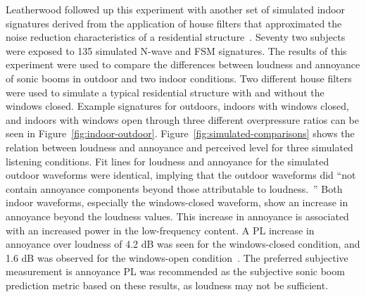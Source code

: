 \documentclass[]{aiaa-tc}%
\begin{document}
Leatherwood followed up this experiment with another set of simulated indoor signatures derived from the application of house filters that approximated the noise reduction characteristics of a residential structure~\cite{leatherwood1993loudness}. Seventy two subjects were exposed to 135 simulated N-wave and FSM signatures. The results of this experiment were used to compare the differences between loudness and annoyance of sonic booms in outdoor and two indoor conditions. Two different house filters were used to simulate a typical residential structure with and without the windows closed. Example signatures for outdoors, indoors with windows closed, and indoors with windows open through three different overpressure ratios can be seen in Figure~\ref{fig:indoor-outdoor}. Figure~\ref{fig:simulated-comparisons} shows the relation between loudness and annoyance and perceived level for three simulated listening conditions. Fit lines for loudness and annoyance for the simulated outdoor waveforms were identical, implying that the outdoor waveforms did ``not contain annoyance components beyond those attributable to loudness.~\cite{leatherwood2002summary}'' Both indoor waveforms, especially the windows-closed waveform, show an increase in annoyance beyond the loudness values. This increase in annoyance is associated with an increased power in the low-frequency content. A PL increase in annoyance over loudness of 4.2 dB was seen for the windows-closed condition, and 1.6 dB was observed for the windows-open condition~\cite{leatherwood1993loudness}. The preferred subjective measurement is annoyance PL was recommended as the subjective sonic boom prediction metric based on these results, as loudness may not be sufficient.
\end{document}
